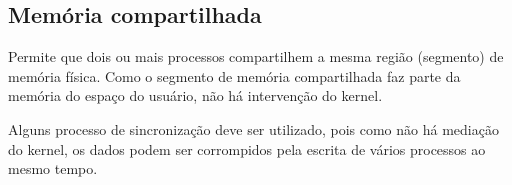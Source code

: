 \subsection*{Memória compartilhada}
 
Permite que dois ou mais processos compartilhem a mesma região
 (segmento) de memória física. Como o segmento de memória
 compartilhada faz parte da memória do espaço do usuário, não há
 intervenção do kernel. 

 Alguns processo de sincronização deve ser utilizado, pois como não há
 mediação do kernel, os dados podem ser corrompidos pela escrita de
 vários processos ao mesmo tempo.



